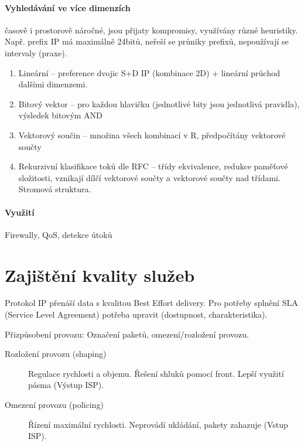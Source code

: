 \documentclass[a4paper, 11pt]{report}
\begin{document}
\paragraph{Vyhledávání ve více dimenzích}
časově i prostorově náročné, jsou přijaty kompromisy, využívány různé heuristiky. Např. prefix IP má maximálně 24bitů, neřeší se průniky prefixů, nepoužívají se intervaly (praxe).

\begin{enumerate}
	\item Lineární -- preference dvojic S+D IP (kombinace 2D) + lineární průchod dalšími dimenzemi.
	\item Bitový vektor -- pro každou hlavičku (jednotlivé bity jsou jednotlivá pravidla), výsledek bitovým AND
	\item Vektorový součin -- množina všech kombinací v R, předpočítány vektorové součty
	\item Rekurzivní klasifikace toků dle RFC -- třídy ekvivalence, redukce paměťové složitosti, vznikají dílčí vektorové součty a vektorové součty nad třídami. Stromová struktura.
\end{enumerate}

\paragraph{Využití} Firewally, QoS, detekce útoků

\section{Zajištění kvality služeb}

Protokol IP přenáší data s kvalitou Best Effort delivery. Pro potřeby splnění SLA (Service Level Agreement) potřeba upravit (dostupnost, charakteristika).

Přizpůsobení provozu: Označení paketů, omezení/rozložení provozu.

\begin{description}
	\item[Rozložení provozu (shaping)] Regulace rychlosti a objemu. Řešení shluků pomocí front. Lepší využití pásma (Výstup ISP).
	\item[Omezení provozu (policing)] Řízení maximální rychlosti. Neprovádí ukládání, pakety zahazuje (Vstup ISP).
\end{description}
\end{document}
